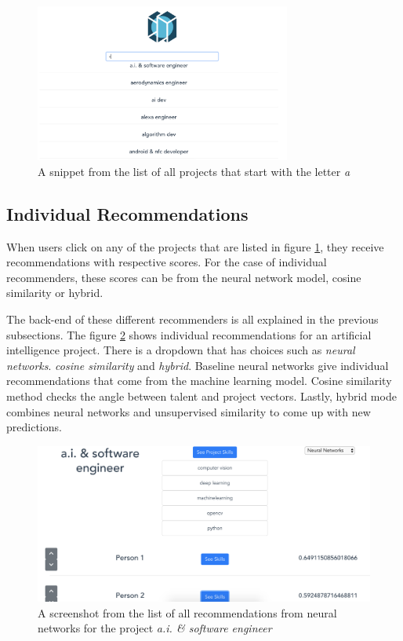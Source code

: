  \begin{figure}[!ht]
	\centering
	\includegraphics[width=0.75\textwidth]{figures/DashboardProjects.png}
	\caption{A snippet from the list of all projects that start with the letter \textit{a}}
	\label{fig:dashboard-projects}
\end{figure}

\subsection{Individual Recommendations}

When users click on any of the projects that are listed in figure \ref{fig:dashboard-projects}, they receive recommendations with respective scores. For the case of individual recommenders, these scores can be from the neural network model, cosine similarity or hybrid.

The back-end of these different recommenders is all explained in the previous subsections. The figure \ref{fig:dashboard-individual} shows individual recommendations for an artificial intelligence project. There is a dropdown that has choices such as \textit{neural networks}. \textit{cosine similarity} and \textit{hybrid}. Baseline neural networks give individual recommendations that come from the machine learning model. Cosine similarity method checks the angle between talent and project vectors. Lastly, hybrid mode combines neural networks and unsupervised similarity to come up with new predictions.

 \begin{figure}[!ht]
	\centering
	\includegraphics[width=\textwidth]{figures/DashboardIndividual.png}
	\caption{A screenshot from the list of all recommendations from neural networks for the project \textit{a.i. \& software engineer}}
	\label{fig:dashboard-individual}
\end{figure}

